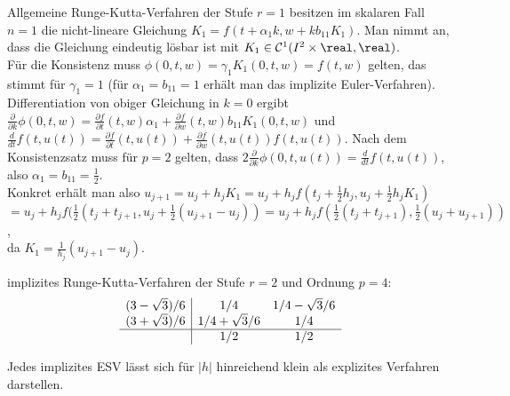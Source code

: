 \begin{Bsp}
    Allgemeine Runge-Kutta-Verfahren der Stufe $r = 1$ besitzen im
    skalaren Fall $n = 1$ die nicht-lineare Gleichung
    $K_1 = f(t + \alpha_1 k, w + k b_{11} K_1)$.
    Man nimmt an, dass die Gleichung eindeutig lösbar ist mit
    $K_1 \in \C^1(I^2 \times \real, \real)$.\\
    Für die Konsistenz muss $\phi(0, t, w) = \gamma_1 K_1(0, t, w) = f(t, w)$
    gelten, das stimmt für $\gamma_1 = 1$
    (für $\alpha_1 = b_{11} = 1$ erhält man das implizite Euler-Verfahren).
    Differentiation von obiger Gleichung in $k = 0$ ergibt
    $\frac{\partial}{\partial k} \phi(0, t, w) =
    \frac{\partial f}{\partial t}(t, w) \alpha_1 +
    \frac{\partial f}{\partial w}(t, w) b_{11} K_1(0, t, w)$ und\\
    $\frac{d}{dt} f(t, u(t)) = \frac{\partial f}{\partial t}(t, u(t)) +
    \frac{\partial f}{\partial w}(t, u(t)) f(t, u(t))$.
    Nach dem Konsistenzsatz muss für $p = 2$ gelten, dass
    $2 \frac{\partial}{\partial k} \phi(0, t, u(t)) = \frac{d}{dt} f(t, u(t))$,
    also $\alpha_1 = b_{11} = \frac{1}{2}$.\\
    Konkret erhält man also
    $u_{j+1} = u_j + h_j K_1 =
    u_j + h_j f(t_j + \frac{1}{2} h_j, u_j + \frac{1}{2} h_j K_1)$\\
    $= u_j + h_j f(\frac{1}{2} (t_j + t_{j+1},
    u_j + \frac{1}{2} (u_{j+1} - u_j)) =
    u_j + h_j f(\frac{1}{2} (t_j + t_{j+1}), \frac{1}{2} (u_j + u_{j+1}))$,\\
    da $K_1 = \frac{1}{h_j} (u_{j+1} - u_j)$.
\end{Bsp}

\begin{Bsp}
    implizites Runge-Kutta-Verfahren der Stufe $r = 2$
    und Ordnung $p = 4$:
    \begin{align*}
        \begin{array}{c|cc}
            (3 - \sqrt{3})/6 & 1/4 & 1/4 - \sqrt{3}/6\\
            (3 + \sqrt{3})/6 & 1/4 + \sqrt{3}/6 & 1/4\\\hline
            & 1/2 & 1/2
        \end{array}
    \end{align*}
\end{Bsp}

\linie

\begin{Bem}
    Jedes implizites ESV lässt sich für $|h|$ hinreichend klein als
    explizites Verfahren darstellen.
\end{Bem}

